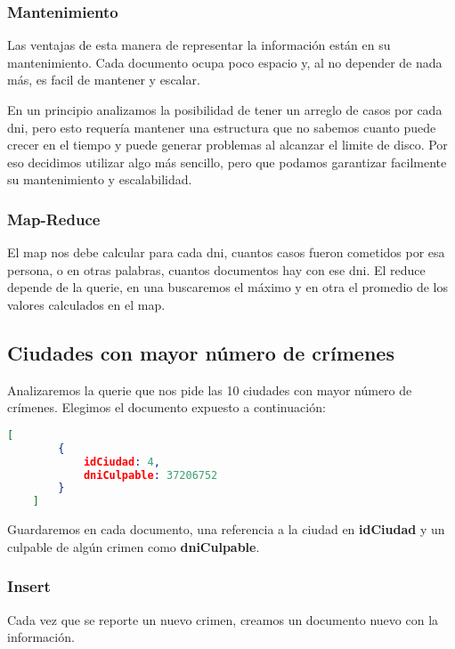 \documentclass[11pt, a4paper]{article}
\begin{document}
\subsubsection{Mantenimiento}

Las ventajas de esta manera de representar la informaci\'on est\'an en su mantenimiento. Cada documento ocupa poco espacio y, al no depender de nada m\'as, es facil de mantener y escalar. \

En un principio analizamos la posibilidad de tener un arreglo de casos por cada dni, pero esto requer\'ia mantener una estructura que no sabemos cuanto puede crecer en el tiempo y puede generar problemas al alcanzar el limite de disco. Por eso decidimos utilizar algo m\'as sencillo, pero que podamos garantizar facilmente su mantenimiento y escalabilidad.

\subsubsection{Map-Reduce}

El map nos debe calcular para cada dni, cuantos casos fueron cometidos por esa persona, o en otras palabras, cuantos documentos hay con ese dni. El reduce depende de la querie, en una buscaremos el máximo y en otra el promedio de los valores calculados en el map. 

\subsection{Ciudades con mayor n\'umero de cr\'imenes}

Analizaremos la querie que nos pide las 10 ciudades con mayor n\'umero de crímenes. Elegimos el documento expuesto a continuación:\

\begin{lstlisting}[language=json]
	[
		{
			idCiudad: 4,
			dniCulpable: 37206752
		}
	]
\end{lstlisting}

Guardaremos en cada documento,  una referencia a la ciudad en \textbf{idCiudad} y un culpable de alg\'un crimen como \textbf{dniCulpable}.

\subsubsection{Insert}

Cada vez que se reporte un nuevo crimen, creamos un documento nuevo con la informaci\'on.
\end{document}
